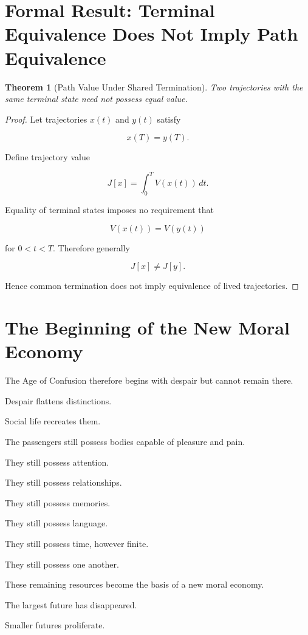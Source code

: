 \documentclass[11pt,oneside]{book}
\newtheorem{theorem}{Theorem}[chapter]
\theoremstyle{definition}
\theoremstyle{remark}
\begin{document}
\section{Formal Result: Terminal Equivalence Does Not Imply Path Equivalence}

\begin{theorem}[Path Value Under Shared Termination]
Two trajectories with the same terminal state need not possess equal value.
\end{theorem}

\begin{proof}
Let trajectories \(x(t)\) and \(y(t)\) satisfy

\[
x(T)=y(T).
\]

Define trajectory value

\[
J[x]
=
\int_0^T
V(x(t))\,dt.
\]

Equality of terminal states imposes no requirement that

\[
V(x(t))=V(y(t))
\]

for \(0<t<T\). Therefore generally

\[
J[x]\neq J[y].
\]

Hence common termination does not imply equivalence of lived trajectories.
\end{proof}

\section{The Beginning of the New Moral Economy}

The Age of Confusion therefore begins with despair but cannot remain there.

Despair flattens distinctions.

Social life recreates them.

The passengers still possess bodies capable of pleasure and pain.

They still possess attention.

They still possess relationships.

They still possess memories.

They still possess language.

They still possess time, however finite.

They still possess one another.

These remaining resources become the basis of a new moral economy.

The largest future has disappeared.

Smaller futures proliferate.
\end{document}
